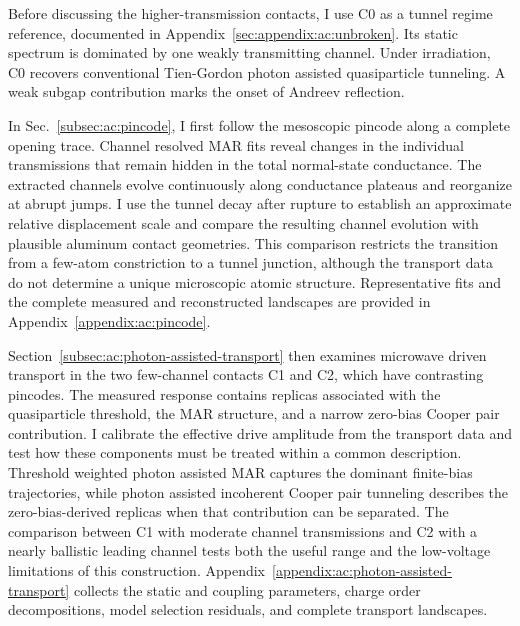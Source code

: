     Before discussing the higher-transmission contacts, I use C0 as a tunnel regime reference, documented in Appendix~\ref{sec:appendix:ac:unbroken}. Its static spectrum is dominated by one weakly transmitting channel. Under irradiation, C0 recovers conventional Tien-Gordon photon assisted quasiparticle tunneling. A weak subgap contribution marks the onset of Andreev reflection.

    In Sec.~\ref{subsec:ac:pincode}, I first follow the mesoscopic pincode along a complete opening trace. Channel resolved MAR fits reveal changes in the individual transmissions that remain hidden in the total normal-state conductance. The extracted channels evolve continuously along conductance plateaus and reorganize at abrupt jumps. I use the tunnel decay after rupture to establish an approximate relative displacement scale and compare the resulting channel evolution with plausible aluminum contact geometries. This comparison restricts the transition from a few-atom constriction to a tunnel junction, although the transport data do not determine a unique microscopic atomic structure. Representative fits and the complete measured and reconstructed landscapes are provided in Appendix~\ref{appendix:ac:pincode}.

    Section~\ref{subsec:ac:photon-assisted-transport} then examines microwave driven transport in the two few-channel contacts C1 and C2, which have contrasting pincodes. The measured response contains replicas associated with the quasiparticle threshold, the MAR structure, and a narrow zero-bias Cooper pair contribution. I calibrate the effective drive amplitude from the transport data and test how these components must be treated within a common description. Threshold weighted photon assisted MAR captures the dominant finite-bias trajectories, while photon assisted incoherent Cooper pair tunneling describes the zero-bias-derived replicas when that contribution can be separated. The comparison between C1 with moderate channel transmissions and C2 with a nearly ballistic leading channel tests both the useful range and the low-voltage limitations of this construction. Appendix~\ref{appendix:ac:photon-assisted-transport} collects the static and coupling parameters, charge order decompositions, model selection residuals, and complete transport landscapes.

